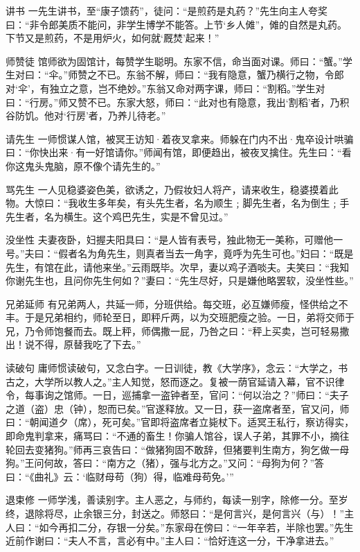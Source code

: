 \documentclass[12pt,UTF8]{ctexbook}
\begin{document}
讲书
一先生讲书，至“康子馈药”，徒问：“是煎药是丸药？”先生向主人夸奖曰：“非令郎美质不能问，非学生博学不能答。上节‘乡人傩”，傩的自然是丸药。下节又是煎药，不是用炉火，如何就‘厩焚’起来！”

师赞徒
馆师欲为固馆计，每赞学生聪明。东家不信，命当面对课。师曰：“蟹。”学生对曰：“伞。”师赞之不已。东翁不解，师曰：“我有隐意，蟹乃横行之物，令郎对‘伞’，有独立之意，岂不绝妙。”东翁又命对两字课，师曰：“割稻。”学生对曰：“行房。”师又赞不已。东家大怒，师曰：“此对也有隐意，我出‘割稻’者，乃积谷防饥。他对‘行房’者，乃养儿待老。”

请先生
一师惯谋人馆，被冥王访知·着夜叉拿来。师躲在门内不出·鬼卒设计哄骗曰：“你快出来·有一好馆请你。”师闻有馆，即便趋出，被夜叉擒住。先生曰：“看你这鬼头鬼脑，原不像个请先生的。”

骂先生
一人见稳婆姿色美，欲诱之，乃假妆妇人将产，请来收生，稳婆摸着此物。大惊曰：“我收生多年矣，有头先生者，名为顺生﹔脚先生者，名为倒生﹔手先生者，名为横生。这个鸡巴先生，实是不曾见过。”

没坐性
夫妻夜卧，妇握夫阳具曰：“是人皆有表号，独此物无一美称，可赠他一号。”夫曰：“假者名为角先生，则真者当去一角字，竟呼为先生可也。”妇曰：“既是先生，有馆在此，请他来坐。”云雨既毕。次早，妻以鸡子酒啖夫。夫笑曰：“我知你谢先生也，且问你先生何如？”妻曰：“先生尽好，只是嫌他略罢软，没坐性些。”

兄弟延师
有兄弟两人，共延一师，分班供给。每交班，必互嫌师瘦，怪供给之不丰。于是兄弟相约，师轮至日，即秤斤两，以为交班肥瘦之验。一日，弟将交师于兄，乃令师饱餐而去。既上秤，师偶撒一屁，乃咎之曰：“秤上买卖，岂可轻易撒出！说不得，原替我吃了下去。”

读破句
庸师惯读破句，又念白字。一日训徒，教《大学序》，念云：“大学之，书古之，大学所以教人之。”主人知觉，怒而逐之。复被一荫官延请入幕，官不识律令，每事询之馆师。一日，巡捕拿一盗钟者至，官问：“何以治之？”师曰：“夫子之道（盗）忠（钟），恕而已矣。”官遂释放。又一日，获一盗席者至，官又问，师曰：“朝闻道夕（席），死可矣。”官即将盗席者立毙杖下。适冥王私行，察访得实，即命鬼判拿来，痛骂曰：“不通的畜生！你骗人馆谷，误人子弟，其罪不小，摘往轮回去变猪狗。”师再三哀告曰：“做猪狗固不敢辞，但猪要判生南方，狗乞做一母狗。”王问何故，答曰：“南方之（猪），强与北方之。”又问：“母狗为何？”答曰：“《曲礼》云：‘临财母苟（狗）得，临难母苟免。’”

退束修
一师学浅，善读别字。主人恶之，与师约，每读一别字，除修一分。至岁终，退除将尽，止余银三分，封送之。师怒曰：“是何言兴，是何言兴（与）！”主人曰：“如今再扣二分，存银一分矣。”东家母在傍曰：“一年辛若，半除也罢。”先生近前作谢曰：“夫人不言，言必有中。”主人曰：“恰好连这一分，干净拿进去。”
\end{document}
